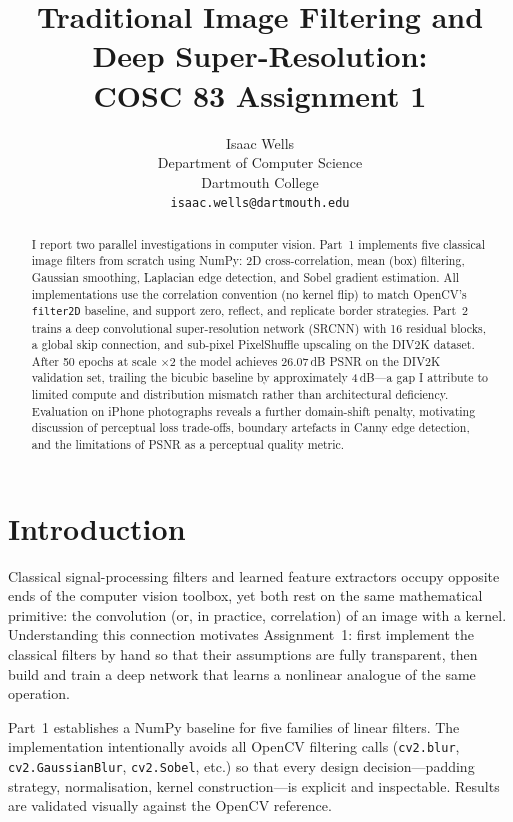 \documentclass{article}
\title{Traditional Image Filtering and Deep Super-Resolution:\\
       COSC 83 Assignment 1}
\author{%
  Isaac Wells \\
  Department of Computer Science \\
  Dartmouth College \\
  \texttt{isaac.wells@dartmouth.edu}
}
\begin{document}
\maketitle

\begin{abstract}
I report two parallel investigations in computer vision.
Part~1 implements five classical image filters from scratch using NumPy:
2D cross-correlation, mean (box) filtering, Gaussian smoothing, Laplacian
edge detection, and Sobel gradient estimation.
All implementations use the correlation convention (no kernel flip) to match
OpenCV's \texttt{filter2D} baseline, and support zero, reflect, and replicate
border strategies.
Part~2 trains a deep convolutional super-resolution network (SRCNN) with 16
residual blocks, a global skip connection, and sub-pixel PixelShuffle upscaling
on the DIV2K dataset.
After 50 epochs at scale $\times 2$ the model achieves 26.07\,dB PSNR on the
DIV2K validation set, trailing the bicubic baseline by approximately 4\,dB---a
gap I attribute to limited compute and distribution mismatch rather than
architectural deficiency.
Evaluation on iPhone photographs reveals a further domain-shift penalty,
motivating discussion of perceptual loss trade-offs, boundary artefacts in
Canny edge detection, and the limitations of PSNR as a perceptual quality
metric.
\end{abstract}

\section{Introduction}

Classical signal-processing filters and learned feature extractors occupy
opposite ends of the computer vision toolbox, yet both rest on the same
mathematical primitive: the convolution (or, in practice, correlation) of an
image with a kernel.
Understanding this connection motivates Assignment~1: first implement the
classical filters by hand so that their assumptions are fully transparent, then
build and train a deep network that learns a nonlinear analogue of the same
operation.

Part~1 establishes a NumPy baseline for five families of linear filters.
The implementation intentionally avoids all OpenCV filtering calls
(\texttt{cv2.blur}, \texttt{cv2.GaussianBlur}, \texttt{cv2.Sobel}, etc.) so
that every design decision---padding strategy, normalisation, kernel
construction---is explicit and inspectable.
Results are validated visually against the OpenCV reference.
\end{document}
